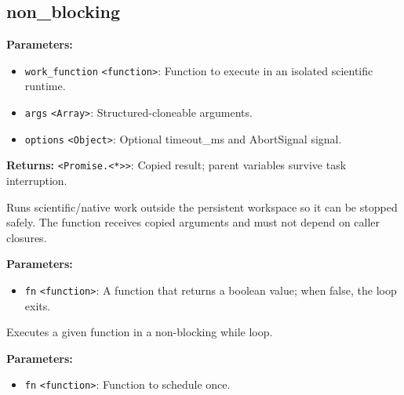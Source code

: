 \documentclass[12pt,a4paper]{article}
\begin{document}
\subsection{non\_blocking}
\vspace{5mm}
\noindent {}


\noindent \textbf{Parameters:}
\begin{itemize}
  \item \texttt{work\_function} \texttt{<function>}: Function to execute in an isolated scientific runtime.
  \item \texttt{args} \texttt{<Array>}: Structured-cloneable arguments.
  \item \texttt{options} \texttt{<Object>}: Optional timeout\_ms and AbortSignal signal.
\end{itemize}

\noindent \textbf{Returns:} \texttt{<Promise.<*>>}: Copied result; parent variables survive task interruption.

\noindent Runs scientific/native work outside the persistent workspace so it can be stopped safely.
The function receives copied arguments and must not depend on caller closures.

\vspace{5mm}
\noindent {}


\noindent \textbf{Parameters:}
\begin{itemize}
  \item \texttt{fn} \texttt{<function>}: A function that returns a boolean value; when false, the loop exits.
\end{itemize}

\noindent Executes a given function in a non-blocking while loop.

\vspace{5mm}
\noindent {}


\noindent \textbf{Parameters:}
\begin{itemize}
  \item \texttt{fn} \texttt{<function>}: Function to schedule once.
\end{itemize}
\end{document}
